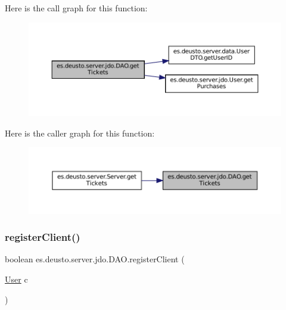 Here is the call graph for this function\+:
\nopagebreak
\begin{figure}[H]
\begin{center}
\leavevmode
\includegraphics[width=350pt]{classes_1_1deusto_1_1server_1_1jdo_1_1_d_a_o_a7bbfb6c3ed916f93425081d4a24ec6ea_cgraph}
\end{center}
\end{figure}
Here is the caller graph for this function\+:
\nopagebreak
\begin{figure}[H]
\begin{center}
\leavevmode
\includegraphics[width=350pt]{classes_1_1deusto_1_1server_1_1jdo_1_1_d_a_o_a7bbfb6c3ed916f93425081d4a24ec6ea_icgraph}
\end{center}
\end{figure}
\mbox{\label{classes_1_1deusto_1_1server_1_1jdo_1_1_d_a_o_a783758c37658336ee1e4e995a672a0ce}} 
\subsubsection{\texorpdfstring{registerClient()}{registerClient()}}
{\footnotesize\ttfamily boolean es.\+deusto.\+server.\+jdo.\+D\+A\+O.\+register\+Client (\begin{DoxyParamCaption}\item[{\mbox{\hyperlink{classes_1_1deusto_1_1server_1_1jdo_1_1_user}{User}}}]{c }\end{DoxyParamCaption})}



